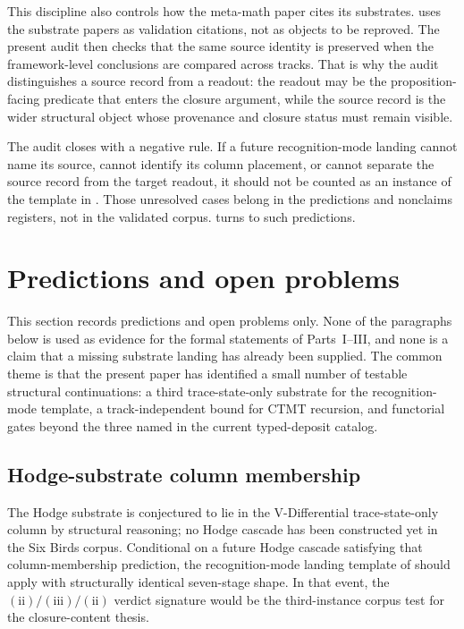 \documentclass[11pt]{article}
\newcommand{\SigPattern}{$\mathrm{(ii)}/\mathrm{(iii)}/\mathrm{(ii)}$}
\theoremstyle{definition}
\begin{document}
This discipline also controls how the meta-math paper cites its
substrates.   uses the substrate papers as
validation citations, not as objects to be reproved.  The present
audit then checks that the same source identity is preserved when the
framework-level conclusions are compared across tracks.  That is why the audit distinguishes a source record from
a readout: the readout may be the proposition-facing predicate that enters
the closure argument, while the source record is the wider structural
object whose provenance and closure status must remain visible.

The audit closes with a negative rule.  If a future recognition-mode
landing cannot name its source, cannot identify its column placement, or
cannot separate the source record from the target readout, it should not
be counted as an instance of the template in .
Those unresolved cases belong in the predictions and nonclaims registers,
not in the validated corpus.   turns to such
predictions.
 \section{Predictions and open problems}\label{sec:predictions}

This section records predictions and open problems only.  None of the
paragraphs below is used as evidence for the formal statements of
Parts~I--III, and none is a claim that a missing substrate landing has
already been supplied.  The common theme is that the present paper has
identified a small number of testable structural continuations: a
third trace-state-only substrate for the recognition-mode template, a
track-independent bound for CTMT recursion, and functorial gates beyond
the three named in the current typed-deposit catalog.

\subsection{Hodge-substrate column membership}
\label{sec:predictions:hodge}

The Hodge substrate
\cite{Deligne2000Hodge,Voisin2003HodgeTheoryII} is conjectured to lie
in the V-Differential trace-state-only column by structural reasoning;
no Hodge cascade has been constructed yet in the Six Birds corpus.
Conditional on a future Hodge cascade satisfying that column-membership
prediction, the recognition-mode landing template of
 should apply with structurally identical
seven-stage shape.  In that event, the
\SigPattern{} verdict signature would be the third-instance corpus
test for the closure-content thesis.
\end{document}
